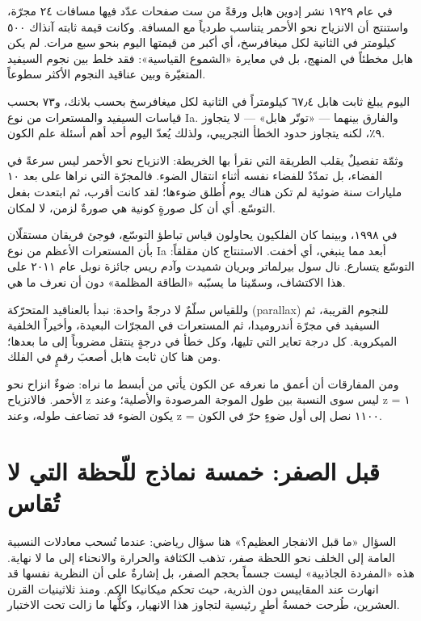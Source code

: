 \documentclass[12pt,a4paper,openany]{book}
\begin{document}
في عام ١٩٢٩ نشر إدوين هابل ورقةً من ست صفحات عدّد فيها مسافات ٢٤ مجرّة، واستنتج أن الانزياح نحو الأحمر يتناسب طردياً مع المسافة. وكانت قيمة ثابته آنذاك ٥٠٠ كيلومتر في الثانية لكل ميغافرسخ، أي أكبر من قيمتها اليوم بنحو سبع مرات. لم يكن هابل مخطئاً في المنهج، بل في معايرة «الشموع القياسية»: فقد خلط بين نجوم السيفيد المتغيّرة وبين عناقيد النجوم الأكثر سطوعاً.


اليوم يبلغ ثابت هابل ٦٧٫٤ كيلومتراً في الثانية لكل ميغافرسخ بحسب بلانك، و٧٣ بحسب قياسات السيفيد والمستعرات من نوع Ia. والفارق بينهما — «توتّر هابل» — لا يتجاوز ٩٪، لكنه يتجاوز حدود الخطأ التجريبي، ولذلك يُعدّ اليوم أحد أهم أسئلة علم الكون.


وثمّة تفصيلٌ يقلب الطريقة التي نقرأ بها الخريطة: الانزياح نحو الأحمر ليس سرعةً في الفضاء، بل تمدّدٌ للفضاء نفسه أثناء انتقال الضوء. فالمجرّة التي نراها على بعد ١٠ مليارات سنة ضوئية لم تكن هناك يوم أُطلق ضوءها؛ لقد كانت أقرب، ثم ابتعدت بفعل التوسّع. أي أن كل صورةٍ كونية هي صورةٌ لزمن، لا لمكان.


في ١٩٩٨، وبينما كان الفلكيون يحاولون قياس تباطؤ التوسّع، فوجئ فريقان مستقلّان بأن المستعرات الأعظم من نوع Ia أبعد مما ينبغي، أي أخفت. الاستنتاج كان مقلقاً: التوسّع يتسارع. نال سول بيرلماتر وبريان شميدت وآدم ريس جائزة نوبل عام ٢٠١١ على هذا الاكتشاف، وسمّينا ما يسبّبه «الطاقة المظلمة» دون أن نعرف ما هي.


وللقياس سلّمٌ لا درجةً واحدة: نبدأ بالعناقيد المتحرّكة (parallax) للنجوم القريبة، ثم السيفيد في مجرّة أندروميدا، ثم المستعرات في المجرّات البعيدة، وأخيراً الخلفية الميكروية. كل درجة تعاير التي تليها، وكل خطأ في درجةٍ ينتقل مضروباً إلى ما بعدها؛ ومن هنا كان ثابت هابل أصعبَ رقمٍ في الفلك.


ومن المفارقات أن أعمق ما نعرفه عن الكون يأتي من أبسط ما نراه: ضوءٌ انزاح نحو الأحمر. فالانزياح z ليس سوى النسبة بين طول الموجة المرصودة والأصلية؛ وعند z = ١ يكون الضوء قد تضاعف طوله، وعند z = ١١٠٠ نصل إلى أول ضوءٍ حرّ في الكون.


\chapter*{قبل الصفر: خمسة نماذج للّحظة التي لا تُقاس}




السؤال «ما قبل الانفجار العظيم؟» هنا سؤال رياضي: عندما تُسحب معادلات النسبية العامة إلى الخلف نحو اللحظة صفر، تذهب الكثافة والحرارة والانحناء إلى ما لا نهاية. هذه «المفردة الجاذبية» ليست جسماً بحجم الصفر، بل إشارةٌ على أن النظرية نفسها قد انهارت عند المقاييس دون الذرية، حيث تحكم ميكانيكا الكم. ومنذ ثلاثينيات القرن العشرين، طُرحت خمسةُ أطرٍ رئيسية لتجاوز هذا الانهيار، وكلُّها ما زالت تحت الاختبار.
\end{document}
